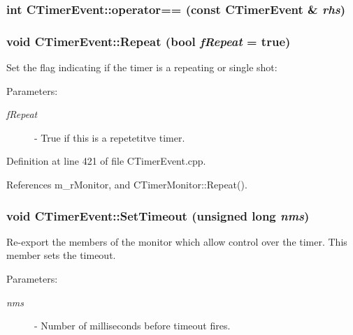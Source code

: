 \subsubsection{\setlength{\rightskip}{0pt plus 5cm}int CTimer\-Event::operator== (const CTimer\-Event \& {\em rhs})\hspace{0.3cm}{\tt  [private]}}\label{classCTimerEvent_c2}


\subsubsection{\setlength{\rightskip}{0pt plus 5cm}void CTimer\-Event::Repeat (bool {\em f\-Repeat} = true)}\label{classCTimerEvent_a9}


Set the flag indicating if the timer is a repeating or single shot: \begin{Desc}
\item[Parameters: ]\par
\begin{description}
\item[{\em 
f\-Repeat}]- True if this is a repetetitve timer. \end{description}
\end{Desc}


Definition at line 421 of file CTimer\-Event.cpp.

References m\_\-r\-Monitor, and CTimer\-Monitor::Repeat().
\subsubsection{\setlength{\rightskip}{0pt plus 5cm}void CTimer\-Event::Set\-Timeout (unsigned long {\em nms})}\label{classCTimerEvent_a8}


Re-export the members of the monitor which allow control over the timer. This member sets the timeout.\begin{Desc}
\item[Parameters: ]\par
\begin{description}
\item[{\em 
nms}]- Number of milliseconds before timeout fires. \end{description}
\end{Desc}


